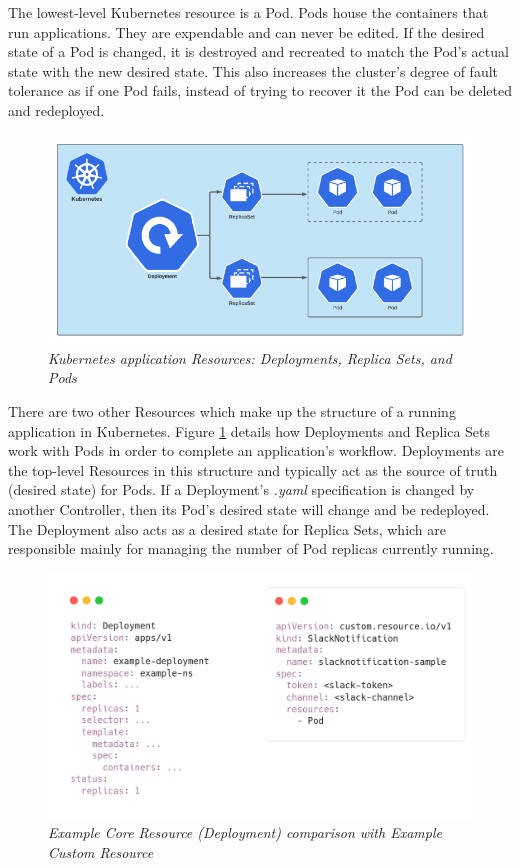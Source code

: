\documentclass{article}
\begin{document}
The lowest-level Kubernetes resource is a Pod. Pods house the containers that run applications. They are expendable and can never be edited. If the desired state of a Pod is changed, it is destroyed and recreated to match the Pod's actual state with the new desired state. This also increases the cluster's degree of fault tolerance as if one Pod fails, instead of trying to recover it the Pod can be deleted and redeployed. 

\begin{figure}[H]
    \centering
    \includegraphics[width=160mm]{tech/resource-struct.png}
    \caption{\emph{Kubernetes application Resources: Deployments, Replica Sets, and Pods}}
    \label{resource-struct}
\end{figure}

There are two other Resources which make up the structure of a running application in Kubernetes. Figure \ref{resource-struct} \cite{k8s-rolling} details how Deployments and Replica Sets work with Pods in order to complete an application's workflow. Deployments are the top-level Resources in this structure and typically act as the source of truth (desired state) for Pods. If a Deployment's \emph{.yaml} specification is changed by another Controller, then its Pod's desired state will change and be redeployed. The Deployment also acts as a desired state for Replica Sets, which are responsible mainly for managing the number of Pod replicas currently running. 

\begin{figure}[H]
    \centering
    \includegraphics[width=125mm]{tech/core-cr.png}
    \caption{\emph{Example Core Resource (Deployment) comparison with Example Custom Resource}}
    \label{core-cr}
\end{figure}
\end{document}
